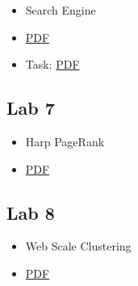 \begin{itemize}
\tightlist
\item
  Search Engine
\item
  \href{https://drive.google.com/open?id=0B88HKpainTSfWXVuRGlCcFJZSUU}{PDF}
\item
  Task:
  \href{https://drive.google.com/open?id=0B88HKpainTSfLWN1V2Vib19DdTA}{PDF}
\end{itemize}

\subsection{Lab 7}\label{lab-7}

\begin{itemize}
\tightlist
\item
  Harp PageRank
\item
  \href{https://drive.google.com/open?id=0B88HKpainTSfaDNBTzdsTk1PQ1k}{PDF}
\end{itemize}

\subsection{Lab 8}\label{lab-8}

\begin{itemize}
\tightlist
\item
  Web Scale Clustering
\item
  \href{https://drive.google.com/open?id=0B88HKpainTSfaVN6SUxhOGFPQUk}{PDF}
\end{itemize}
